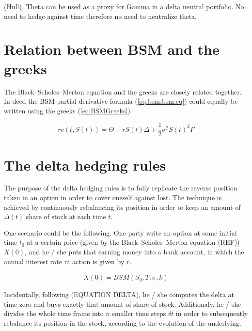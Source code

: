\documentclass[12pt]{report}
\newcommand{\call}[2]{c\left( #1, #2\right)}
\newcommand{\St}{S\left(t\right)}
\newcommand{\BSMGreeks}[1]{r\call{t}{#1} = \Theta + r #1 \Delta + \frac{1}{2} \sigma ^2 #1 ^2 \Gamma}
\begin{document}
(Hull), Theta can be used as a proxy for Gamma in a delta neutral portfolio.
No need to hedge against time therefore no need to neutralize theta.


\section{Relation between BSM and the greeks}
\label{sec:BSMGreeks}

The Black--Scholes--Merton equation and the greeks are closely related together.
In deed the BSM partial derivative formula (\ref{eq:bsm:bsm:eq}) could equally be written using the greeks (\ref{eq:BSMGreeks})

\begin{center}
  \begin{equation}
    \BSMGreeks{\St}
    \label{eq:BSMGreeks}
  \end{equation}
\end{center}



\section{The delta hedging rules}
\label{sec:bsm:delta:hedge}

The purpose of the delta hedging rules is to fully replicate the reverse position taken in an option in order to cover oneself against lost. The technique is achieved by continuously rebalancing its position in order to keep an amount of $\Delta(t)$ share of stock at each time $t$.

One scenario could be the following. One party write an option at some initial time $t_0$ at a certain price (given by the Black--Scholes--Merton equation (REF)) $X(0)$, and he / she puts that earning money into a bank account, in which the annual interest rate in action is given by $r$.

\begin{align}
X(0) = BSM(S_0, T, \sigma, k)
\end{align}

Incidentally, following (EQUATION DELTA), he / she computes the delta at time zero and buys exactly that amount of share of stock. Additionaly, he / she divides the whole time frame into $n$ smaller time steps $\delta t$ in order to subsequently rebalance its position in the stock, according to the evolution of the underlying.
\end{document}
